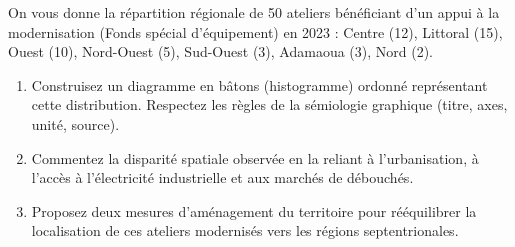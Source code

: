 \documentclass[11pt]{article}
\begin{document}
\begin{exercice}
On vous donne la répartition régionale de 50 ateliers bénéficiant d'un appui à la modernisation (Fonds spécial d'équipement) en 2023 : Centre (12), Littoral (15), Ouest (10), Nord-Ouest (5), Sud-Ouest (3), Adamaoua (3), Nord (2).
\begin{enumerate}
    \item Construisez un diagramme en bâtons (histogramme) ordonné représentant cette distribution. Respectez les règles de la sémiologie graphique (titre, axes, unité, source).
    \item Commentez la disparité spatiale observée en la reliant à l'urbanisation, à l'accès à l'électricité industrielle et aux marchés de débouchés.
    \item Proposez deux mesures d'aménagement du territoire pour rééquilibrer la localisation de ces ateliers modernisés vers les régions septentrionales.
\end{enumerate}
\end{exercice}
\end{document}
